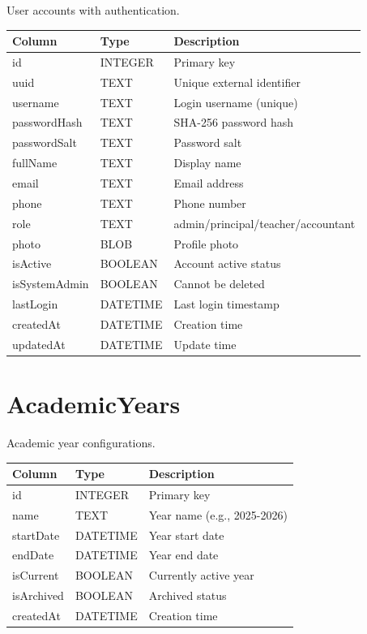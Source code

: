 \documentclass[12pt,a4paper]{report}
\begin{document}
User accounts with authentication.

\begin{longtable}{@{}p{4cm}p{2.5cm}p{6.5cm}@{}}
\toprule
\textbf{Column} & \textbf{Type} & \textbf{Description} \\
\midrule
\endhead
id & INTEGER & Primary key \\
uuid & TEXT & Unique external identifier \\
username & TEXT & Login username (unique) \\
passwordHash & TEXT & SHA-256 password hash \\
passwordSalt & TEXT & Password salt \\
fullName & TEXT & Display name \\
email & TEXT & Email address \\
phone & TEXT & Phone number \\
role & TEXT & admin/principal/teacher/accountant \\
photo & BLOB & Profile photo \\
isActive & BOOLEAN & Account active status \\
isSystemAdmin & BOOLEAN & Cannot be deleted \\
lastLogin & DATETIME & Last login timestamp \\
createdAt & DATETIME & Creation time \\
updatedAt & DATETIME & Update time \\
\bottomrule
\end{longtable}

\section{AcademicYears}

Academic year configurations.

\begin{longtable}{@{}p{4cm}p{2.5cm}p{6.5cm}@{}}
\toprule
\textbf{Column} & \textbf{Type} & \textbf{Description} \\
\midrule
\endhead
id & INTEGER & Primary key \\
name & TEXT & Year name (e.g., 2025-2026) \\
startDate & DATETIME & Year start date \\
endDate & DATETIME & Year end date \\
isCurrent & BOOLEAN & Currently active year \\
isArchived & BOOLEAN & Archived status \\
createdAt & DATETIME & Creation time \\
\bottomrule
\end{longtable}
\end{document}
